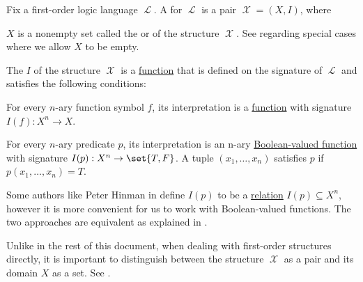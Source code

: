 \begin{definition}\label{def:first_order_structure}
  Fix a first-order logic language \( \mscrL \). A  for \( \mscrL \) is a pair \( \mscrX = (X, I) \), where
  \begin{thmenum}
     \( X \) is a nonempty set called the  or  of the structure \( \mscrX \). See  regarding special cases where we allow \( X \) to be empty.

     The  \( I \) of the structure \( \mscrX \) is a \hyperref[def:function]{function} that is defined on the signature of \( \mscrL \) and satisfies the following conditions:
    \begin{thmenum}
       For every \( n \)-ary function symbol \( f \), its interpretation is a \hyperref[def:function]{function} with signature \( I(f): X^n \to X \).

       For every \( n \)-ary predicate \( p \), its interpretation is an n-ary \hyperref[def:boolean_operator]{Boolean-valued function} with signature \( I(p): X^n \to \set{ T, F } \). A tuple \( (x_1, \ldots, x_n) \) satisfies \( p \) if \( p(x_1, \ldots, x_n) = T \).
    \end{thmenum}
  \end{thmenum}
\end{definition}
\begin{comments}
  \item Some authors like Peter Hinman in \cite[def. 2.1.15(iii)]{Hinman2005} define \( I(p) \) to be a \hyperref[def:relation]{relation} \( I(p) \subseteq X^n \), however it is more convenient for us to work with Boolean-valued functions. The two approaches are equivalent as explained in .
  \item Unlike in the rest of this document, when dealing with first-order structures directly, it is important to distinguish between the structure \( \mscrX \) as a pair and its domain \( X \) as a set. See .
\end{comments}

